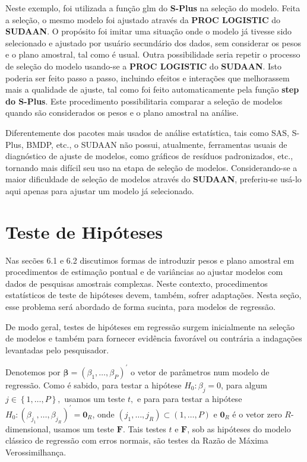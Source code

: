 \documentclass[]{book}
\begin{document}
Neste exemplo, foi utilizada a função glm do \textbf{S-Plus} na seleção
do modelo. Feita a seleção, o mesmo modelo foi ajustado através da
\textbf{PROC LOGISTIC} do \textbf{SUDAAN}. O propósito foi imitar uma
situação onde o modelo já tivesse sido selecionado e ajustado por
usuário secundário dos dados, sem considerar os pesos e o plano
amostral, tal como é usual. Outra possibilidade seria repetir o processo
de seleção do modelo usando-se a \textbf{PROC LOGISTIC} do
\textbf{SUDAAN}. Isto poderia ser feito passo a passo, incluindo efeitos
e interações que melhorassem mais a qualidade de ajuste, tal como foi
feito automaticamente pela função \textbf{step do S-Plus}. Este
procedimento possibilitaria comparar a seleção de modelos quando são
considerados os pesos e o plano amostral na análise.

Diferentemente dos pacotes mais usados de análise estatística, tais como
SAS, S-Plus, BMDP, etc., o SUDAAN não possui, atualmente, ferramentas
usuais de diagnóstico de ajuste de modelos, como gráficos de resíduos
padronizados, etc., tornando mais difícil seu uso na etapa de seleção de
modelos. Considerando-se a maior dificuldade de seleção de modelos
através do \textbf{SUDAAN}, preferiu-se usá-lo aqui apenas para ajustar
um modelo já selecionado.

\section{Teste de Hipóteses}\label{teste-de-hipoteses}

Nas secões 6.1 e 6.2 discutimos formas de introduzir pesos e plano
amostral em procedimentos de estimação pontual e de variâncias ao
ajustar modelos com dados de pesquisas amostrais complexas. Neste
contexto, procedimentos estatísticos de teste de hipóteses devem,
também, sofrer adaptações. Nesta seção, esse problema será abordado de
forma sucinta, para modelos de regressão.

De modo geral, testes de hipóteses em regressão surgem inicialmente na
seleção de modelos e também para fornecer evidência favorável ou
contrária a indagações levantadas pelo pesquisador.

Denotemos por
\(\mathbf{\beta }=\left( \beta _{1},\ldots ,\beta _{P}\right) ^{\prime }\)
o vetor de parâmetros num modelo de regressão. Como é sabido, para
testar a hipótese \(H_{0}:\beta _{j}=0\), para algum
\(j\in \left\{ 1,\ldots ,P\right\} \mathbf{,}\) usamos um teste \(t,\) e
para para testar a hipótese
\(H_{0}:\left( \beta _{j_{1}},\ldots ,\beta _{j_{R}}\right) ^{\prime }=\mathbf{0}_{R}\),
onde
\(\left( j_{1},\ldots ,j_{R}\right) \subset \left( 1,\ldots ,P\right)\)
e \(\mathbf{0}_{R}\) é o vetor zero \(R\)-dimensional, usamos um teste
\(\mathbf{F}\). Tais testes \(t\) e \(\mathbf{F}\), sob as hipóteses do
modelo clássico de regressão com erros normais, são testes da Razão de
Máxima Verossimilhança.
\end{document}
